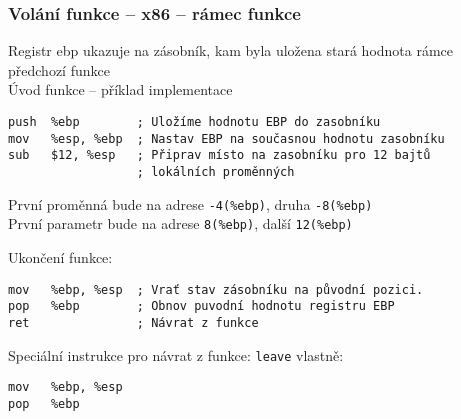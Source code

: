 \documentclass{beamer}
\begin{document}
\begin{frame}[fragile]
\frametitle{Volání funkce -- x86 -- rámec funkce}
Registr ebp ukazuje na zásobník, kam byla uložena stará hodnota rámce předchozí funkce\\
\bigskip
Úvod funkce – příklad implementace
\begin{verbatim}
push  %ebp        ; Uložíme hodnotu EBP do zasobníku
mov   %esp, %ebp  ; Nastav EBP na současnou hodnotu zasobníku
sub   $12, %esp   ; Připrav místo na zasobníku pro 12 bajtů
                  ; lokálních proměnných
\end{verbatim}

První proměnná bude na adrese \texttt{-4(\%ebp)}, druha \texttt{-8(\%ebp)}\\
První parametr bude na adrese \texttt{8(\%ebp)}, další \texttt{12(\%ebp)}

Ukončení funkce:
\begin{verbatim}
mov   %ebp, %esp  ; Vrať stav zásobníku na původní pozici.
pop   %ebp        ; Obnov puvodní hodnotu registru EBP
ret               ; Návrat z funkce
\end{verbatim}

Speciální instrukce pro návrat z funkce:
\texttt{leave} vlastně: 
\begin{verbatim}
mov   %ebp, %esp 
pop   %ebp        
\end{verbatim}

\end{frame}
\end{document}
